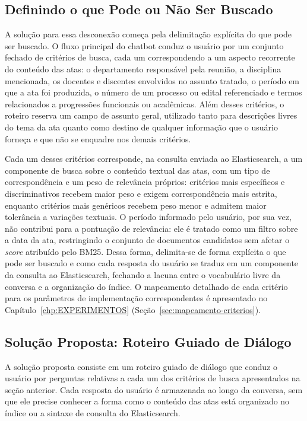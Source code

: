 \subsection{Definindo o que Pode ou Não Ser Buscado}

A solução para essa desconexão começa pela delimitação explícita do que pode ser buscado. O fluxo principal do chatbot conduz o usuário por um conjunto fechado de critérios de busca, cada um correspondendo a um aspecto recorrente do conteúdo das atas: o departamento responsável pela reunião, a disciplina mencionada, os docentes e discentes envolvidos no assunto tratado, o período em que a ata foi produzida, o número de um processo ou edital referenciado e termos relacionados a progressões funcionais ou acadêmicas. Além desses critérios, o roteiro reserva um campo de assunto geral, utilizado tanto para descrições livres do tema da ata quanto como destino de qualquer informação que o usuário forneça e que não se enquadre nos demais critérios.

Cada um desses critérios corresponde, na consulta enviada ao Elasticsearch, a um componente de busca sobre o conteúdo textual das atas, com um tipo de correspondência e um peso de relevância próprios: critérios mais específicos e discriminativos recebem maior peso e exigem correspondência mais estrita, enquanto critérios mais genéricos recebem peso menor e admitem maior tolerância a variações textuais. O período informado pelo usuário, por sua vez, não contribui para a pontuação de relevância: ele é tratado como um filtro sobre a data da ata, restringindo o conjunto de documentos candidatos sem afetar o \textit{score} atribuído pelo BM25. Dessa forma, delimita-se de forma explícita o que pode ser buscado e como cada resposta do usuário se traduz em um componente da consulta ao Elasticsearch, fechando a lacuna entre o vocabulário livre da conversa e a organização do índice. O mapeamento detalhado de cada critério para os parâmetros de implementação correspondentes é apresentado no Capítulo~\ref{chp:EXPERIMENTOS} (Seção~\ref{sec:mapeamento-criterios}).

\subsection{Solução Proposta: Roteiro Guiado de Diálogo}

A solução proposta consiste em um roteiro guiado de diálogo que conduz o usuário por perguntas relativas a cada um dos critérios de busca apresentados na seção anterior. Cada resposta do usuário é armazenada ao longo da conversa, sem que ele precise conhecer a forma como o conteúdo das atas está organizado no índice ou a sintaxe de consulta do Elasticsearch.

